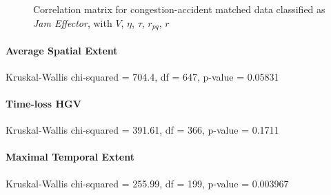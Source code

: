 \begin{figure}[!ht]
	\centering
	\caption{Correlation matrix for congestion-accident matched data classified as \textit{Jam Effector}, with $V$, $\eta$, $\tau$, $r_{pq}$, $r$}
	\label{img:correlation_matrix_selected_effector_cramers}
\end{figure}


\paragraph{Average Spatial Extent}
Kruskal-Wallis chi-squared = 704.4, df = 647, p-value = 0.05831

\paragraph{Time-loss HGV}
Kruskal-Wallis chi-squared = 391.61, df = 366, p-value = 0.1711





\paragraph{Maximal Temporal Extent}
Kruskal-Wallis chi-squared = 255.99, df = 199, p-value = 0.003967

